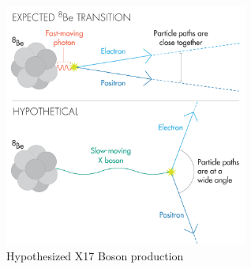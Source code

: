 \begin{figure}[h!]
\centering
\includegraphics[width=8cm]{thesis_figures/VectorBoson_450.png}
\caption{Hypothesized X17 Boson production~\cite{Quanta_magazine}}
\label{fig:ATOMKI}
\end{figure}


